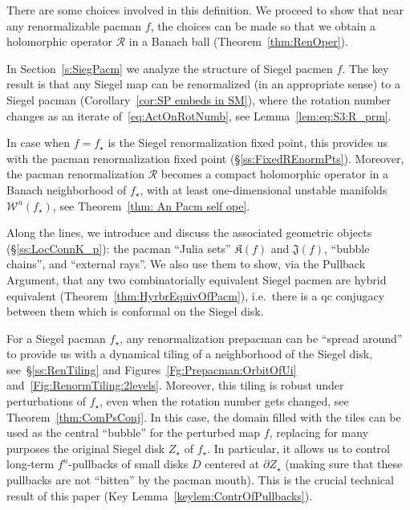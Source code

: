 \documentclass[]{amsart}
\newcommand\RR{\mathcal{R}}
\newcommand\Jul{{\mathfrak J}}
\newcommand\Kfilled{{\mathfrak K}}
\newcommand{\str}{{\star}}
\newcommand\WW{\mathcal{W}}
\theoremstyle{remark}
\numberwithin{equation}{section}
\theoremstyle{definition}
\newcommand{\di}{\partial}
\begin{document}
There are some choices involved in this definition. We proceed to show that near any
renormalizable pacman $f$, the  choices can be made  so that we
obtain a holomorphic operator $\RR$  in a Banach ball (Theorem~\ref{thm:RenOper}). 

 
In Section~\ref{s:SiegPacm}
we analyze the structure of Siegel pacmen $f$. 
The key result is  that any Siegel  map 
can be renormalized (in an appropriate sense) to a Siegel pacman (Corollary~\ref{cor:SP embeds in SM}), where the rotation number changes as an iterate of~\eqref{eq:ActOnRotNumb}, see Lemma~\ref{lem:eq:S3:R_prm}.



In case when  $f=f_\str$  is the Siegel renormalization fixed point,
this provides us with the pacman renormalization fixed point (\S \ref{ss:FixedREnormPts}). 
Moreover, the pacman  renormalization $\RR$  becomes a compact holomorphic operator in a
Banach neighborhood of $f_\str$, with at least one-dimensional  unstable
manifolds $\WW^u(f_\str)$, see Theorem~\ref{thm: An Pacm  self ope}. 

Along the lines, we  introduce and discuss the  associated  geometric objects (\S\ref{ss:LocConnK_p}):
the  pacman ``Julia sets'' $\Kfilled(f)$ and  $\Jul(f)$,
``bubble chains'',  and ``external rays''. 
We also use them to show, via the Pullback Argument,
that any two combinatorially equivalent Siegel pacmen are hybrid equivalent (Theorem~\ref{thm:HyrbrEquivOfPacm}),
i.e.~there is a qc conjugacy between them which is 
conformal on the Siegel disk.  



For a Siegel pacman $f_\str$, any renormalization prepacman can be
``spread around'' to provide us with a dynamical tiling of a
neighborhood of the Siegel disk, see~\S\ref{ss:RenTiling} and Figures~\ref{Fg:Prepacman:OrbitOfUi} and~\ref{Fig:RenormTiling:2levels}. Moreover, this tiling is robust under perturbations of $f_\str$, even when the rotation number gets changed, see Theorem~\ref{thm:ComPsConj}.
In this case, the domain filled with the tiles can be used as  the central
``bubble'' for  the perturbed  map $ f$, replacing for many purposes the original Siegel 
disk $Z_\str$  of $f_\str$.  In particular, it allows us to control long-term
$ f^n$-pullbacks of small disks $D$ centered at $\di Z_\str$
(making sure that these pullbacks are not   ``bitten''  %
 by the pacman mouth). This is the crucial technical result of this paper (Key Lemma~\ref{keylem:ContrOfPullbacks}).
\end{document}
